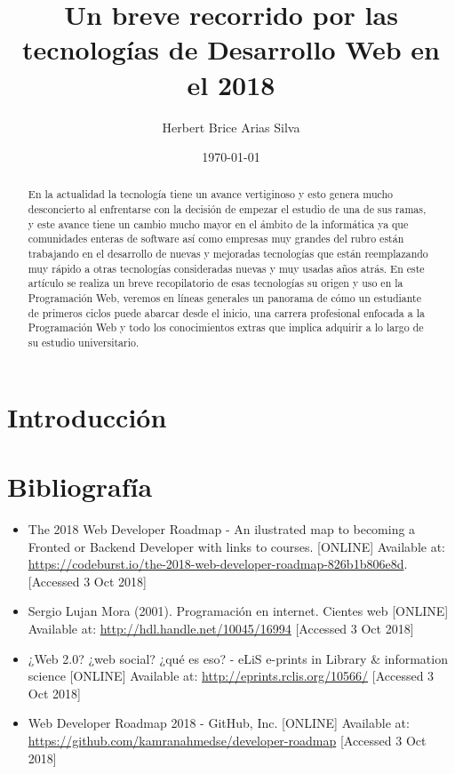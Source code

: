 \documentclass[a4paper]{article}
\title{Un breve recorrido por las tecnologías de Desarrollo Web en el 2018 }
\author{Herbert Brice Arias Silva}
\date{\today}
\begin{document}
\maketitle

\begin{abstract}
   En la actualidad la tecnología tiene un avance vertiginoso y esto genera
   mucho desconcierto al enfrentarse con la decisión de empezar el estudio de
   una de sus ramas, y este avance tiene un cambio mucho mayor en el ámbito de
   la informática ya que comunidades enteras de software así como empresas muy
   grandes del rubro están trabajando en el desarrollo de nuevas y mejoradas
   tecnologías que están reemplazando muy rápido a otras tecnologías
   consideradas nuevas y muy usadas años atrás. En este artículo se realiza un
   breve recopilatorio de esas tecnologías su origen y uso en la Programación
   Web, veremos en líneas generales un panorama de cómo un estudiante de
   primeros ciclos puede abarcar desde el inicio, una carrera profesional
   enfocada a la Programación Web y todo los conocimientos extras que implica
   adquirir a lo largo de su estudio universitario.
\end{abstract}

\section{Introducción}


\section{Bibliografía }

\begin{itemize}
   \item The 2018 Web Developer Roadmap - An ilustrated map to becoming a
      Fronted or Backend Developer with links to courses. [ONLINE] Available
      at: \url{https://codeburst.io/the-2018-web-developer-roadmap-826b1b806e8d}.
      [Accessed 3 Oct 2018]
\end{itemize}

\begin{itemize}
   \item Sergio Lujan Mora (2001). Programación en internet. Cientes web [ONLINE] Available
      at: \url{http://hdl.handle.net/10045/16994}
      [Accessed 3 Oct 2018]
\end{itemize}

\begin{itemize}
   \item ¿Web 2.0? ¿web social? ¿qué es eso? - eLiS e-prints in Library &
      information science [ONLINE] Available at:
      \url{http://eprints.rclis.org/10566/} [Accessed 3 Oct 2018]
\end{itemize}

\begin{itemize}
   \item Web Developer Roadmap 2018 - GitHub, Inc. [ONLINE] Available at:
      \url{https://github.com/kamranahmedse/developer-roadmap} [Accessed 3 Oct 2018]

\end{itemize}
\end{document}
